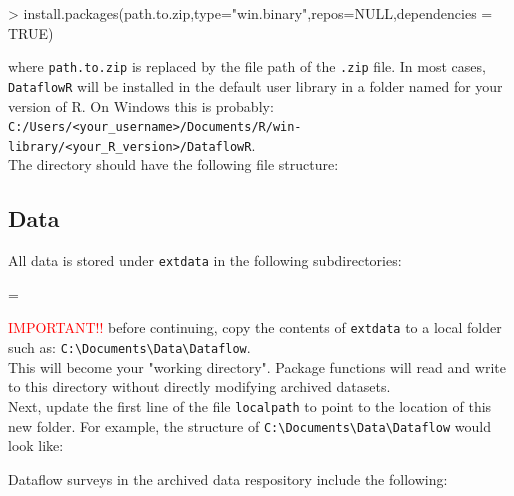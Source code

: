 \documentclass[12pt]{article}
\newenvironment{warning}
{\par\begin{mdframed}[linewidth=2pt,linecolor=red]
\begin{list}{}{\leftmargin=1cm
  \labelwidth=\leftmargin}\item[\Large\ding{43}]}
{\end{list}\end{mdframed}\par}
\begin{document}
\begin{Schunk}
\begin{Sinput}
> install.packages(path.to.zip,type="win.binary",repos=NULL,dependencies = TRUE)
\end{Sinput}
\end{Schunk}

where \texttt{path.to.zip} is replaced by the file path of the \texttt{.zip} file. In most cases, \texttt{DataflowR} will be installed in the default user library in a folder named for your version of R. On Windows this is probably:\vspace{5pt}\\

\texttt{C:/Users/}\verb|<your_username>|\texttt{/Documents/R/win-library/}\verb|<your_R_version>|\texttt{/DataflowR}.\\

The directory should have the following file structure:


\subsection{Data}

All data is stored under \texttt{extdata} in the following subdirectories:\\

\vspace{15pt}
\begin{warning}
\textcolor{red}{IMPORTANT!!} before continuing, copy the contents of \texttt{extdata} to a local folder such as: \verb|C:\Documents\Data\Dataflow|.\\ This will become your "working directory". Package functions will read and write to this directory without directly modifying archived datasets.\\ Next, update the first line of the file \texttt{localpath} to point to the location of this new folder.
For example, the structure of \verb|C:\Documents\Data\Dataflow| would look like:


\end{warning}

Dataflow surveys in the archived data respository include the following:
\end{document}
